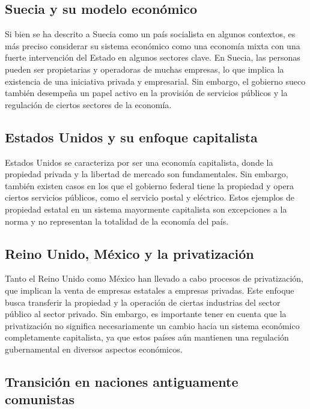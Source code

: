 \documentclass[
  man,
  floatsintext,
  longtable,
  a4paper,
  nolmodern,
  notxfonts,
  notimes,
  12pt,
  colorlinks=true,linkcolor=blue,citecolor=blue,urlcolor=blue]{apa7}
\begin{document}
\subsection{Suecia y su modelo
económico}\label{suecia-y-su-modelo-econuxf3mico}

Si bien se ha descrito a Suecia como un país socialista en algunos
contextos, es más preciso considerar su sistema económico como una
economía mixta con una fuerte intervención del Estado en algunos
sectores clave. En Suecia, las personas pueden ser propietarias y
operadoras de muchas empresas, lo que implica la existencia de una
iniciativa privada y empresarial. Sin embargo, el gobierno sueco también
desempeña un papel activo en la provisión de servicios públicos y la
regulación de ciertos sectores de la economía.

\subsection{Estados Unidos y su enfoque
capitalista}\label{estados-unidos-y-su-enfoque-capitalista}

Estados Unidos se caracteriza por ser una economía capitalista, donde la
propiedad privada y la libertad de mercado son fundamentales. Sin
embargo, también existen casos en los que el gobierno federal tiene la
propiedad y opera ciertos servicios públicos, como el servicio postal y
eléctrico. Estos ejemplos de propiedad estatal en un sistema mayormente
capitalista son excepciones a la norma y no representan la totalidad de
la economía del país.

\subsection{Reino Unido, México y la
privatización}\label{reino-unido-muxe9xico-y-la-privatizaciuxf3n}

Tanto el Reino Unido como México han llevado a cabo procesos de
privatización, que implican la venta de empresas estatales a empresas
privadas. Este enfoque busca transferir la propiedad y la operación de
ciertas industrias del sector público al sector privado. Sin embargo, es
importante tener en cuenta que la privatización no significa
necesariamente un cambio hacia un sistema económico completamente
capitalista, ya que estos países aún mantienen una regulación
gubernamental en diversos aspectos económicos.

\subsection{Transición en naciones antiguamente
comunistas}\label{transiciuxf3n-en-naciones-antiguamente-comunistas}
\end{document}
